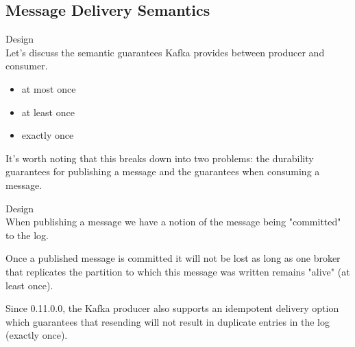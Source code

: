 \subsection{Message Delivery Semantics}
\begin{frame}[plain,t]{Design} %
     \\
    \vspace{2ex}
    Let's discuss the semantic guarantees Kafka provides between producer and consumer.
    \begin{itemize}
        \item at most once
        \item at least once
        \item exactly once
    \end{itemize}

\vspace{2ex}
It's worth noting that this breaks down into two problems: the durability guarantees for publishing a message and the guarantees when consuming a message.
    
    
\end{frame}
\begin{frame}[plain,t]{Design} %
     \\
    \vspace{2ex}
    When publishing a message we have a notion of the message being "committed" to the log. 
    
    \vspace{2ex}
    Once a published message is committed it will not be lost as long as one broker that replicates the partition to which this message was written remains "alive" (at least once). 
    
    \vspace{2ex}
    Since 0.11.0.0, the Kafka producer also supports an idempotent delivery option which guarantees that resending will not result in duplicate entries in the log (exactly once).
    
    
    
\end{frame}
